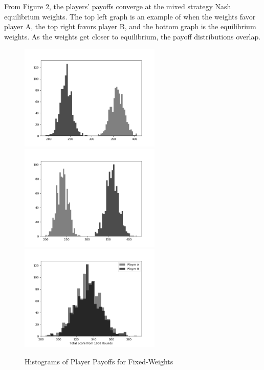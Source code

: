 From Figure 2, the players' payoffs converge at the mixed strategy Nash equilibrium weights. The top left graph is an example of when the weights favor player A, the top right favors player B, and the bottom graph is the equilibrium weights. As the weights get closer to equilibrium, the payoff distributions overlap.

\begin{figure}[h]
\caption{Histograms of Player Payoffs for Fixed-Weights}
\hspace*{-1.5cm} 
\includegraphics[width=0.6\textwidth]{../Figures/hist_1.png}%
\hfill
\includegraphics[width=0.6\textwidth]{../Figures/hist_3.png}%
\\
\hspace*{2.5cm} 
\includegraphics[width=0.6\textwidth]{../Figures/hist_2.png}
\end{figure}





